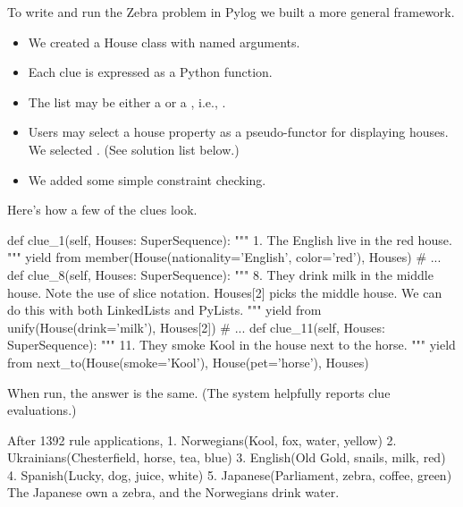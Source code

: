 To write and run the Zebra problem in Pylog we built a more general framework. 
\begin{itemize}[label=\begin{math}\bullet\end{math}]
    \item We created a House class with named arguments.
    \item Each clue is expressed as a Python  function.
    \item The  list may be either a  or a , i.e., .
    \item Users may select a house property as a pseudo-functor for displaying houses. We selected . (See solution list below.)
    \item We added some simple constraint checking.
\end{itemize}
Here's how a few of the clues look.
\smallv

\begin{python}
  def clue_1(self, Houses: SuperSequence):
    """ 1. The English live in the red house.  """
    yield from member(House(nationality='English', color='red'), Houses)
# ...
  def clue_8(self, Houses: SuperSequence):
    """ 8. They drink milk in the middle house.
           Note the use of slice notation. Houses[2] picks the middle house. 
           We can do this with both LinkedLists and PyLists.             """
    yield from unify(House(drink='milk'), Houses[2])
# ...
  def clue_11(self, Houses: SuperSequence):
    """ 11. They smoke Kool in the house next to the horse. """
    yield from next_to(House(smoke='Kool'), House(pet='horse'), Houses)
\end{python}
\smallv

When run, the answer is the same. (The system helpfully reports clue evaluations.)
\smallv

\begin{minipage}{\linewidth}
\begin{python}
After 1392 rule applications,
	1. Norwegians(Kool, fox, water, yellow)
	2. Ukrainians(Chesterfield, horse, tea, blue)
	3. English(Old Gold, snails, milk, red)
	4. Spanish(Lucky, dog, juice, white)
	5. Japanese(Parliament, zebra, coffee, green)
The Japanese own a zebra, and the Norwegians drink water.
\end{python}
\end{minipage}

